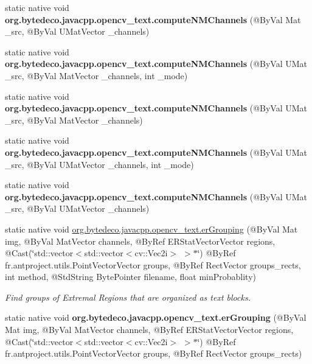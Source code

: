 \begin{DoxyCompactItemize}
static native void {\bfseries org.\+bytedeco.\+javacpp.\+opencv\+\_\+text.\+compute\+N\+M\+Channels} (@By\+Val Mat \+\_\+src, @By\+Val U\+Mat\+Vector \+\_\+channels)
\item 
\mbox{\label{group__text__detect_gaec7559b20b825c35eef44c2a0e034033}} 
static native void {\bfseries org.\+bytedeco.\+javacpp.\+opencv\+\_\+text.\+compute\+N\+M\+Channels} (@By\+Val U\+Mat \+\_\+src, @By\+Val Mat\+Vector \+\_\+channels, int \+\_\+mode)
\item 
\mbox{\label{group__text__detect_ga033d37092f19e10e6652f9cf8cf74d3b}} 
static native void {\bfseries org.\+bytedeco.\+javacpp.\+opencv\+\_\+text.\+compute\+N\+M\+Channels} (@By\+Val U\+Mat \+\_\+src, @By\+Val Mat\+Vector \+\_\+channels)
\item 
\mbox{\label{group__text__detect_ga8385a36c380734465f04a31669100673}} 
static native void {\bfseries org.\+bytedeco.\+javacpp.\+opencv\+\_\+text.\+compute\+N\+M\+Channels} (@By\+Val U\+Mat \+\_\+src, @By\+Val U\+Mat\+Vector \+\_\+channels, int \+\_\+mode)
\item 
\mbox{\label{group__text__detect_ga5ec53e533b6045b6247ffd37ff2db041}} 
static native void {\bfseries org.\+bytedeco.\+javacpp.\+opencv\+\_\+text.\+compute\+N\+M\+Channels} (@By\+Val U\+Mat \+\_\+src, @By\+Val U\+Mat\+Vector \+\_\+channels)
\item 
static native void \hyperlink{group__text__detect_ga3198c558c08dac61bce863d430bf2da6}{org.\+bytedeco.\+javacpp.\+opencv\+\_\+text.\+er\+Grouping} (@By\+Val Mat img, @By\+Val Mat\+Vector channels, @By\+Ref E\+R\+Stat\+Vector\+Vector regions, @Cast(\char`\"{}std\+::vector$<$std\+::vector$<$cv\+::\+Vec2i$>$ $>$$\ast$\char`\"{}) @By\+Ref fr.antproject.utils.Point\+Vector\+Vector groups, @By\+Ref Rect\+Vector groups\+\_\+rects, int method, @Std\+String Byte\+Pointer filename, float min\+Probablity)
\begin{DoxyCompactList}\small\item\em Find groups of Extremal Regions that are organized as text blocks. \end{DoxyCompactList}\item 
\mbox{\label{group__text__detect_gabac27e6b96790d31ba270d3ed311cc60}} 
static native void {\bfseries org.\+bytedeco.\+javacpp.\+opencv\+\_\+text.\+er\+Grouping} (@By\+Val Mat img, @By\+Val Mat\+Vector channels, @By\+Ref E\+R\+Stat\+Vector\+Vector regions, @Cast(\char`\"{}std\+::vector$<$std\+::vector$<$cv\+::\+Vec2i$>$ $>$$\ast$\char`\"{}) @By\+Ref fr.antproject.utils.Point\+Vector\+Vector groups, @By\+Ref Rect\+Vector groups\+\_\+rects)

\end{DoxyCompactItemize}
